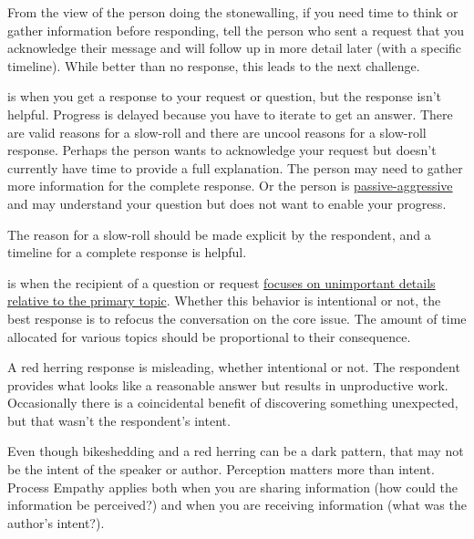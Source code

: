 From the view of the person doing the stonewalling, if you need time to think or gather information before responding, 
tell the person who sent a request that you acknowledge their message and will follow up in more detail later (with a specific timeline). While better than no response, this leads to the next challenge.

\iftoggle{glossaryinmargin}{\marginpar{[Glossary]}}{}
\iftoggle{glossarysubstitutionworks}{\Gls{slow-rolling}}{Slow-rolling} 
is when you get a response to your request or question, but the response isn't helpful. Progress is delayed because you have to iterate to get an answer. There are valid reasons for a slow-roll and there are uncool reasons for a slow-roll response. Perhaps the person wants to acknowledge your request but doesn't currently have time to provide a full explanation. The person may need to gather more information for the complete response. Or the person is \href{https://en.wikipedia.org/wiki/Passive-aggressive_behavior}{passive-aggressive}
\iftoggle{WPinmargin}{\marginpar{$>$Wikipedia: Passive-aggressive behavior}}{}
and may understand your question but does not want to enable your progress. 

The reason for a slow-roll should be made explicit by the respondent, 
and a timeline for a complete response is helpful. 


\label{concept:bikeshedding}
\iftoggle{glossaryinmargin}{\marginpar{[Glossary]}}{}
\iftoggle{glossarysubstitutionworks}{\Gls{bikeshedding}}{Bikeshedding} 
is when the recipient of a question or request 
\href{https://en.wikipedia.org/wiki/Law_of_triviality}{focuses on unimportant details relative to the primary topic}. 
\iftoggle{WPinmargin}{\marginpar{$>$Wikipedia: Law of Triviality]}}{}
Whether this behavior is intentional or not, the best response is to refocus the conversation on the core issue. The amount of time allocated for various topics should be proportional to their consequence. 

A \gls{red herring}\iftoggle{glossaryinmargin}{\marginpar{[Glossary]}}{}
response is misleading, whether intentional or not. The respondent provides what looks like a reasonable answer but results in unproductive work. Occasionally there is a coincidental benefit of discovering something unexpected, but that wasn't the respondent's intent. 


Even though bikeshedding and a red herring can be a dark pattern, that may not be the intent of the speaker or author. Perception matters more than intent.
Process Empathy applies both when you are sharing information (how could the information be perceived?) and when you are receiving information (what was the author's intent?).